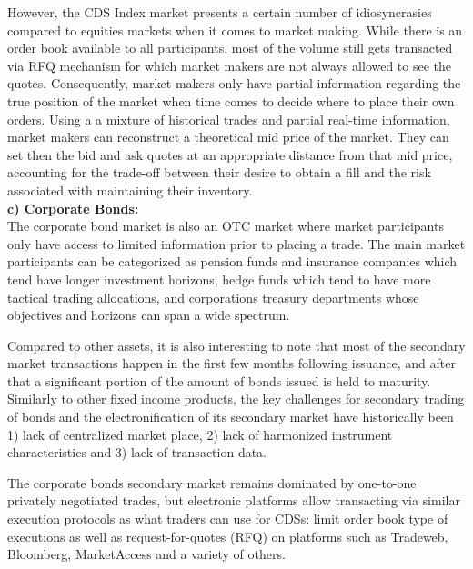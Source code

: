 However, the CDS Index market presents a certain number of idiosyncrasies compared to equities markets when it comes to market making. While there is an order book available to all participants, most of the volume still gets transacted via RFQ mechanism for which market makers are not always allowed to see the quotes. Consequently, market makers only have partial information regarding the true position of the market when time comes to decide where to place their own orders. Using a a mixture of historical trades and partial real-time information, market makers can reconstruct a theoretical mid price of the market. They can set then the bid and ask quotes at an appropriate distance from that mid price, accounting for the trade-off between their desire to obtain a fill and the risk associated with maintaining their inventory. \\

\noindent\textbf{c) Corporate Bonds:} \\

The corporate bond market is also an OTC market where market participants only have access to limited information prior to placing a trade. The main market participants can be categorized as pension funds and insurance companies which tend have longer investment horizons, hedge funds which tend to have more tactical trading allocations, and corporations treasury departments whose objectives and horizons can span a wide spectrum.


Compared to other assets, it is also interesting to note that most of the secondary market transactions happen in the first few months following issuance, and after that a significant portion of the amount of bonds issued is held to maturity. Similarly to other fixed income products, the key challenges for secondary trading of bonds and the electronification of its secondary market have historically been 1) lack of centralized market place, 2) lack of harmonized instrument characteristics and 3) lack of transaction data.


The corporate bonds secondary market remains dominated by one-to-one privately negotiated trades, but electronic platforms allow transacting via similar execution protocols as what traders can use for CDSs: limit order book type of executions as well as request-for-quotes (RFQ) on platforms such as Tradeweb, Bloomberg, MarketAccess and a variety of others.


